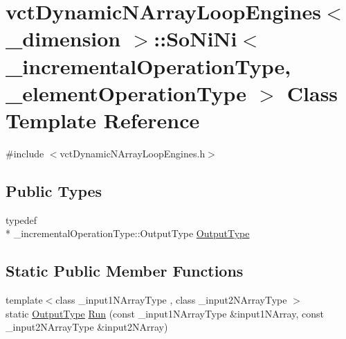 \hypertarget{classvct_dynamic_n_array_loop_engines_1_1_so_ni_ni}{\section{vct\-Dynamic\-N\-Array\-Loop\-Engines$<$ \-\_\-dimension $>$\-:\-:So\-Ni\-Ni$<$ \-\_\-incremental\-Operation\-Type, \-\_\-element\-Operation\-Type $>$ Class Template Reference}
\label{classvct_dynamic_n_array_loop_engines_1_1_so_ni_ni}
}


{\ttfamily \#include $<$vct\-Dynamic\-N\-Array\-Loop\-Engines.\-h$>$}

\subsection*{Public Types}
\begin{DoxyCompactItemize}
\item 
typedef \\*
\-\_\-incremental\-Operation\-Type\-::\-Output\-Type \hyperlink{classvct_dynamic_n_array_loop_engines_1_1_so_ni_ni_aa6e920178bd3513b4b3c325f8e901399}{Output\-Type}
\end{DoxyCompactItemize}
\subsection*{Static Public Member Functions}
\begin{DoxyCompactItemize}
\item 
{\footnotesize template$<$class \-\_\-input1\-N\-Array\-Type , class \-\_\-input2\-N\-Array\-Type $>$ }\\static \hyperlink{classvct_dynamic_n_array_loop_engines_1_1_so_ni_ni_aa6e920178bd3513b4b3c325f8e901399}{Output\-Type} \hyperlink{classvct_dynamic_n_array_loop_engines_1_1_so_ni_ni_a0124b2542b58ea4aed6951388a5f372b}{Run} (const \-\_\-input1\-N\-Array\-Type \&input1\-N\-Array, const \-\_\-input2\-N\-Array\-Type \&input2\-N\-Array)
\end{DoxyCompactItemize}



